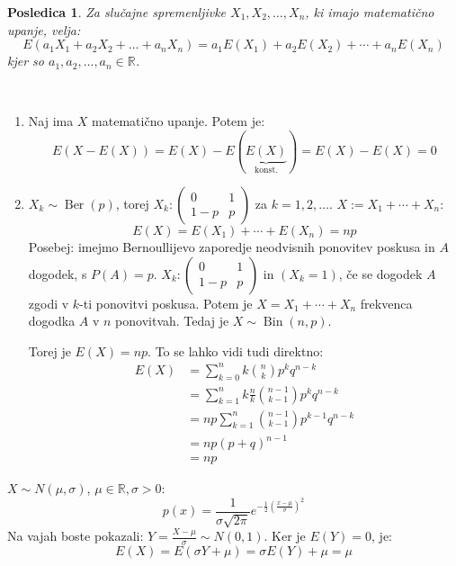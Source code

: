 \documentclass[12pt]{book}
\theoremstyle{definition}
\theoremstyle{plain}
\theoremstyle{plain}
\theoremstyle{plain}
\newtheorem{posledica}{Posledica}
\theoremstyle{remark}
\begin{document}
\begin{posledica}
    Za slučajne spremenljivke $X_1, X_2, \ldots, X_n$, ki imajo matematično upanje, velja: 
    $$
    E\left(a_1 X_1+a_2 X_2+\ldots+a_n X_n\right)=a_1 E\left(X_1\right)+a_2 E \left(X_2\right)+\cdots+a_n E\left(X_n\right)
    $$
    kjer so $a_1, a_2, \ldots, a_n \in \mathbb{R}$.
\end{posledica}

\begin{zgled}
    ~

    \begin{enumerate}
        \item Naj ima $X$ matematično upanje. Potem je: 
        $$
        E(X-E(X))=E(X)-E(\underbrace{E(X)}_{\text{konst.}})=E(X)-E(X)=0
        $$
        \item $X_k \sim \operatorname{Ber}(p)$, torej $X_k:\left(\begin{array}{cc}0 & 1 \\1-p & p\end{array}\right)$ za $k=1, 2, \ldots$. $X:=X_1+ \cdots +X_n$:
        $$
        E(X)=E\left(X_1\right)+\cdots+E\left(X_n\right)=n p
        $$
        Posebej: imejmo Bernoullijevo zaporedje neodvisnih ponovitev poskusa in $A$ dogodek, s $P(A)=p$. $X_k:\left(\begin{array}{cc}0 & 1 \\1-p & p\end{array}\right)$ in $(X_k=1)$, če se dogodek $A$ zgodi v $k$-ti ponovitvi poskusa. Potem je $X=X_1+\cdots+X_n$ frekvenca dogodka $A$ v $n$ ponovitvah. Tedaj je $X \sim \operatorname{Bin}(n,p)$.

        Torej je $E(X)=n p$. To se lahko vidi tudi direktno: 
        $$
        \begin{aligned}
            E(X)&=\sum_{k=0}^n k \binom{n}{k} p^k q^{n-k} \\
            &=\sum_{k=1}^n k  \frac{n}{k} \binom{n-1}{k-1} p^k q^{n-k} \\
            &=np \sum_{k=1}^n\binom{n-1}{k-1} p^{k-1} q^{n-k} \\
            &=n p (p+q)^{n-1} \\
            &= np
        \end{aligned}
        $$
    \end{enumerate}
\end{zgled}

\begin{zgled}
    $X \sim N(\mu, \sigma)$, $\mu \in \mathbb{R}, \sigma>0$:
    $$
    p(x)=\frac{1}{\sigma \sqrt{2 \pi}} e^{-\frac{1}{2}\left(\frac{x-\mu}{\sigma}\right)^2}
    $$
    Na vajah boste pokazali: $Y=\frac{X-\mu}{\sigma} \sim N(0,1)$. Ker je $E(Y) = 0$, je:
    $$
    E(X)=E(\sigma Y+\mu) = \sigma E(Y)+\mu=\mu
    $$
\end{zgled}
\end{document}
